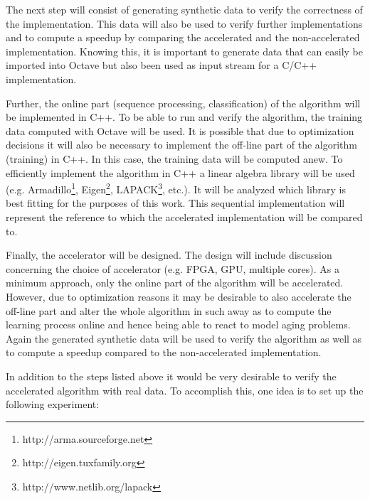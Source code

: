 \documentclass[12pt]{article} %
\begin{document}
The next step will consist of generating synthetic data to verify the
correctness of the implementation. This data will also be used to verify
further implementations and to compute a speedup by comparing the accelerated
and the non-accelerated implementation. Knowing this, it is important to
generate data that can easily be imported into Octave but also been used as
input stream for a C/C++ implementation.

Further, the online part (sequence processing, classification) of the algorithm
will be implemented in C++. To be able to run and verify the algorithm, the
training data computed with Octave will be used. It is possible that due to
optimization decisions it will also be necessary to implement the off-line part
of the algorithm (training) in C++. In this case, the training data will be
computed anew. To efficiently implement the algorithm in C++ a linear algebra
library will be used (e.g. Armadillo\footnote{http://arma.sourceforge.net},
Eigen\footnote{http://eigen.tuxfamily.org},
LAPACK\footnote{http://www.netlib.org/lapack}, etc.).  It will be analyzed
which library is best fitting for the purposes of this work. This sequential
implementation will represent the reference to which the accelerated
implementation will be compared to.

Finally, the accelerator will be designed. The design will include discussion
concerning the choice of accelerator (e.g. FPGA, GPU, multiple cores). As
a minimum approach, only the online part of the algorithm will be accelerated.
However, due to optimization reasons it may be desirable to also accelerate the
off-line part and alter the whole algorithm in such away as to compute the
learning process online and hence being able to react to model aging problems.
Again the generated synthetic data will be used to verify the algorithm as well
as to compute a speedup compared to the non-accelerated implementation.

In addition to the steps listed above it would be very desirable to verify the
accelerated algorithm with real data. To accomplish this, one idea is to set up
the following experiment:
\end{document}
